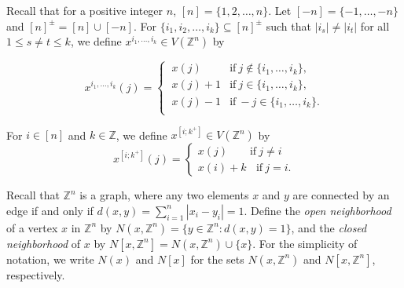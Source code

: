 \documentclass{amsart}
\theoremstyle{definition}
\theoremstyle{remark}
\numberwithin{equation}{section}
\def\Z{{\mathbb{Z}}}
\begin{document}
  Recall that for a positive integer $n$, $[n] = \{1, 2, \ldots, n\}$.  Let  $[-n] = \{-1, \ldots, -n\}$ and $[n]^{\pm} = [n] \cup [-n]$.  For $ \{i_1, i_2, \ldots, i_k\}\subseteq [n]^{\pm}$ such that $|i_s| \neq |i_t|$ for all $1 \leq s \neq t \leq k$, we define 
$x^{i_1, \ldots, i_k} \in V(\Z^n)$ by 

$$
x^{i_1, \ldots, i_k}(j)  = \begin{cases}
	\ x(j) & \text{if} \  j \notin \{i_1, \ldots, i_k\},\\
	\ x(j)+1  & \text{if} \   j \in \{i_1, \ldots, i_k\},  \\
	\ x(j)-1  & \text{if} \   -j \in \{i_1, \ldots, i_k\}.\\
\end{cases}
$$





For $i \in [n]$ and $k \in \Z$, we define $x^{[i;k^+]} \in V(\Z^n)$ by 
$$
x^{[i;k^+]}(j) = \begin{cases} 
	x(j) \ \ \ \  \ \ \  \ \ \text{if} \ j \neq i \\
	x(i)+k  \ \ \ \  \text{if} \ j =i. 
\end{cases}
$$






Recall that $\mathbb{Z}^n$ is a graph, where any two elements $x$ and $y$ are connected by an edge if and only if $d(x, y) = \sum_{i = 1}^n|x_i-y_i| = 1$. Define the \textit{open neighborhood} of a vertex $x$ in $\mathbb{Z}^n$ by 
$N(x, \mathbb{Z}^n) = \{y\in \mathbb{Z}^n : d(x,y)=1\}$, 
and the \textit{closed neighborhood} of $x$ by 
$N[x, \mathbb{Z}^n] = N(x, \mathbb{Z}^n) \cup \{x\}$.
For the simplicity of notation, we write $N(x)$ and $N[x]$ for the sets $N(x, \mathbb{Z}^n)$ and $N[x,\mathbb{Z}^n]$, respectively. 
\end{document}
